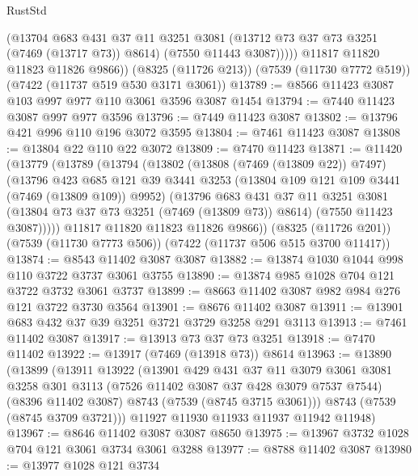 \begin{lexlean}{RustStd}
\begin{coremodule}
              (@13704
                @683
                @431
                @37
                @11
                @3251
                @3081
                (@13712 @73 @37 @73 @3251 (@7469 (@13717 @73)) @8614)
                (@7550 @11443 @3087)))))
        @11817
        @11820
        @11823
        @11826
        @9866))
    (@8325 (@11726 @213))
    (@7539 (@11730 @7772 @519))
    (@7422 (@11737 @519 @530 @3171 @3061))
@13789 := @8566 @11423 @3087 @103 @997 @977 @110 @3061 @3596 @3087 @1454
@13794 := @7440 @11423 @3087 @997 @977 @3596
@13796 := @7449 @11423 @3087
@13802 := @13796 @421 @996 @110 @196 @3072 @3595
@13804 := @7461 @11423 @3087
@13808 := @13804 @22 @110 @22 @3072
@13809 := @7470 @11423
@13871 := @11420
    (@13779
      (@13789
        (@13794
          (@13802
            (@13808 (@7469 (@13809 @22)) @7497)
            (@13796
              @423
              @685
              @121
              @39
              @3441
              @3253
              (@13804 @109 @121 @109 @3441 (@7469 (@13809 @109)) @9952)
              (@13796
                @683
                @431
                @37
                @11
                @3251
                @3081
                (@13804 @73 @37 @73 @3251 (@7469 (@13809 @73)) @8614)
                (@7550 @11423 @3087)))))
        @11817
        @11820
        @11823
        @11826
        @9866))
    (@8325 (@11726 @201))
    (@7539 (@11730 @7773 @506))
    (@7422 (@11737 @506 @515 @3700 @11417))
@13874 := @8543 @11402 @3087 @3087
@13882 := @13874 @1030 @1044 @998 @110 @3722 @3737 @3061 @3755
@13890 := @13874 @985 @1028 @704 @121 @3722 @3732 @3061 @3737
@13899 := @8663 @11402 @3087 @982 @984 @276 @121 @3722 @3730 @3564
@13901 := @8676 @11402 @3087
@13911 := @13901 @683 @432 @37 @39 @3251 @3721 @3729 @3258 @291 @3113
@13913 := @7461 @11402 @3087
@13917 := @13913 @73 @37 @73 @3251
@13918 := @7470 @11402
@13922 := @13917 (@7469 (@13918 @73)) @8614
@13963 := @13890
    (@13899
      (@13911
        @13922
        (@13901
          @429
          @431
          @37
          @11
          @3079
          @3061
          @3081
          @3258
          @301
          @3113
          (@7526 @11402 @3087 @37 @428 @3079 @7537 @7544)
          (@8396 @11402 @3087)
          @8743
          (@7539 (@8745 @3715 @3061)))
        @8743
        (@7539 (@8745 @3709 @3721)))
      @11927
      @11930
      @11933
      @11937
      @11942
      @11948)
@13967 := @8646 @11402 @3087 @3087 @8650
@13975 := @13967 @3732 @1028 @704 @121 @3061 @3734 @3061 @3288
@13977 := @8788 @11402 @3087
@13980 := @13977 @1028 @121 @3734

\end{coremodule}
\end{lexlean}

